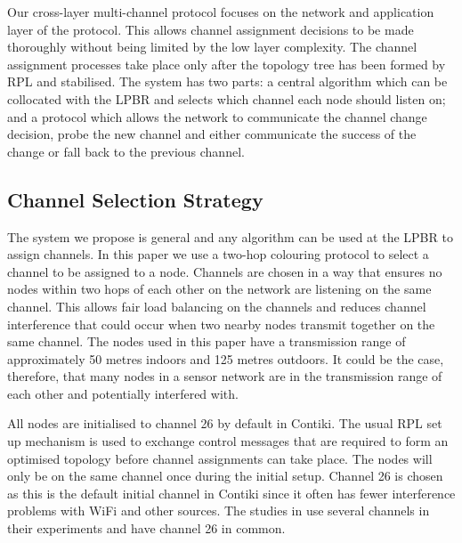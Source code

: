 Our cross-layer multi-channel protocol focuses on the network and application layer of the protocol. This allows channel assignment decisions to be made thoroughly without being limited by the low layer complexity. The channel assignment processes take place only after the topology tree has been formed by RPL and stabilised. The system has two parts: a central algorithm which can be collocated with the LPBR and selects which channel each node should listen on; and a protocol which allows the network to communicate the channel change decision, probe the new channel and either communicate the success of the change or fall back to the previous channel. 

\subsection{Channel Selection Strategy}

The system we propose is general and any algorithm can be used at the LPBR to assign channels. In this paper we use a two-hop colouring protocol to select a channel to be assigned to a node. Channels are chosen in a way that ensures no nodes within two hops of each other on the network are listening on the same channel.
This allows fair load balancing on the channels and reduces channel interference that could occur when two nearby nodes transmit together on the same channel. The nodes used in this paper have a transmission range of approximately 50 metres indoors and 125 metres outdoors. It could be the case, therefore, that many nodes in a sensor network are in the transmission range of each other and potentially interfered with.

All nodes are initialised to channel 26 by default in Contiki.
The usual RPL set up mechanism is used to exchange control messages that are required to form an optimised topology before channel assignments can take place. The nodes will only be on the same channel once during the initial setup. Channel 26 is chosen as this is the default initial channel in Contiki since it often has fewer interference problems with WiFi and other sources. The studies in \cite{chrysso, micmac, watteyne} use several channels in their experiments and have channel 26 in common.
	

